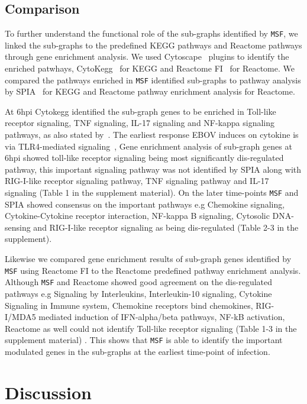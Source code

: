 \documentclass[twocolumn]{article}
\begin{document}
\subsection*{Comparison}

To further understand the functional role of the sub-graphs identified by \texttt{MSF}, we linked the  sub-graphs to the predefined KEGG pathways and Reactome
pathways through gene enrichment analysis. We used Cytoscape~\cite{Cyto} plugins to identify the enriched patwhays, CytoKegg~\cite{Cytokegg} for KEGG and Reactome FI~\cite{Reactome} for Reactome. We compared the pathways enriched in \texttt{MSF} identified sub-graphs to pathway analysis by SPIA~\cite{Tarca} for KEGG and Reactome pathway enrichment analysis for Reactome.

At 6hpi Cytokegg identified the sub-graph genes to be enriched in Toll-like receptor signaling, TNF signaling, IL-17 signaling and NF-kappa signaling pathways, as also stated by~\cite{Olejnik}. The earliest response EBOV induces on cytokine is via TLR4-mediated signaling~\cite{Olejnik}, Gene enrichment analysis of sub-graph genes at 6hpi showed toll-like receptor signaling being most significantly dis-regulated pathway, this important signaling pathway was not identified by SPIA along with RIG-I-like receptor signaling pathway, TNF signaling pathway and IL-17 signaling (Table 1 in the supplement material). On the later time-points \texttt{MSF} and SPIA showed consensus on the important pathways e.g Chemokine signaling, Cytokine-Cytokine receptor interaction, NF-kappa B signaling, Cytosolic DNA-sensing and RIG-I-like receptor signaling as being dis-regulated (Table 2-3 in the supplement).

Likewise we compared gene enrichment results of sub-graph genes identified by \texttt{MSF} using Reactome FI to the Reactome predefined pathway enrichment analysis. Although \texttt{MSF} and Reactome showed good agreement on the dis-regulated pathways e.g Signaling by Interleukins, Interleukin-10 signaling, Cytokine Signaling in Immune system, Chemokine receptors bind chemokines, RIG-I/MDA5 mediated induction of IFN-alpha/beta pathways, NF-kB activation, Reactome as well could not identify Toll-like receptor signaling (Table 1-3 in the supplement material) . This shows that \texttt{MSF} is able to identify the important modulated genes in the sub-graphs at the earliest time-point of infection.


\section*{Discussion}
\end{document}
